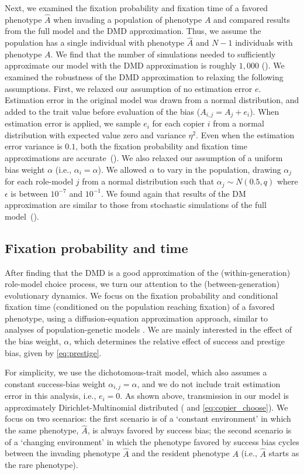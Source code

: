 \documentclass[12pt]{extarticle}
\begin{document}
Next, we examined the fixation probability and fixation time of a favored phenotype $\hat{A}$ when invading a population of phenotype $A$ and compared results from the full model and the DMD approximation.
Thus, we assume the population has a single individual with phenotype $\hat{A}$ and $N-1$ individuals with phenotype $A$. 
We find that the number of simulations needed to sufficiently approximate our model with the DMD approximation is roughly $1,000$ ().
We examined the robustness of the DMD approximation to relaxing the following assumptions.
First, we relaxed our assumption of no estimation error $e$.
Estimation error in the original model was drawn from a normal distribution, and added to the trait value before evaluation of the bias ($A_{i,j} = A_j + e_i$).
When estimation error is applied, we sample $e_i$ for each copier $i$ from a normal distribution with expected value zero and variance $\eta^2$.
Even when the estimation error variance is $0.1$, both the fixation probability and fixation time approximations are accurate~(). 
We also relaxed our assumption of a uniform bias weight $\alpha$ (i.e., $\alpha_i=\alpha$). We allowed $\alpha$ to vary in the population, drawing $\alpha_j$ for each role-model $j$ from a normal distribution such that $\alpha_j \sim N(0.5,q)$ where $\epsilon$ is between $10^{-7}$ and $10^{-1}$. 
We found again that results of the DM approximation are similar to those from stochastic simulations of the full model~().


\subsection*{Fixation probability and time}
After finding that the DMD is a good approximation of the (within-generation) role-model choice process, we turn our attention to the (between-generation) evolutionary dynamics.
We focus on the fixation probability and conditional fixation time (conditioned on the population reaching fixation) of a favored phenotype, using a diffusion-equation approximation approach, similar to analyses of population-genetic models \citep{kimura,kimura_average,otto_fixation}.
We are mainly interested in the effect of the bias weight, $\alpha$, which determines the relative effect of success and prestige bias, given by \cref{eq:prestige}.

For simplicity, we use the dichotomous-trait model, which also assumes a constant success-bias weight $\alpha_{i,j}=\alpha$, and we do not include trait estimation error in this analysis, i.e., $e_i=0$.
As shown above, transmission in our model is approximately Dirichlet-Multinomial distributed ( and \cref{eq:copier_choose}).
We focus on two scenarios: the first scenario is of a `constant environment' in which the same phenotype, $\hat{A}$, is always favored by success bias; the second scenario is of a `changing environment' in which the phenotype favored by success bias cycles between the invading phenotype $\hat{A}$ and the resident phenotype $A$ (i.e., $\hat{A}$ starts as the rare phenotype).
\end{document}
